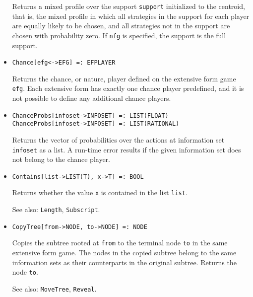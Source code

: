 \begin{itemize}
\bd
Returns a mixed profile over the support \verb+support+
initialized to the centroid, that is, the mixed profile in which 
all strategies in the support for each player are equally likely to be
chosen, and all strategies not in the support are chosen with probability
zero.  If \verb+nfg+ is specified, the support is the full support.  
\ed

\item
\protect \large \begin{verbatim}
Chance[efg<->EFG] =: EFPLAYER
\end{verbatim}\normalsize

\bd
Returns the chance, or nature, player defined on the
extensive form game \verb+efg+.  Each extensive form has exactly one
chance player predefined, and it is not possible to define any additional
chance players.
\ed

\item
\protect \large \begin{verbatim}
ChanceProbs[infoset->INFOSET] =: LIST(FLOAT)
ChanceProbs[infoset->INFOSET] =: LIST(RATIONAL)
\end{verbatim}\normalsize

\bd
Returns the vector of probabilities over the actions at
information set \verb+infoset+ as a list.  A run-time error results if
the given information set does not belong to the chance player.
\ed

\item
\protect \large \begin{verbatim}
Contains[list->LIST(T), x->T] =: BOOL
\end{verbatim}\normalsize

\bd
Returns whether the value \verb+x+ is contained in the list
\verb+list+.
\item
[See also:] {\tt Length}, {\tt Subscript}.
\ed

\item
\protect \large \begin{verbatim}
CopyTree[from->NODE, to->NODE] =: NODE
\end{verbatim}\normalsize

\bd
Copies the subtree rooted at \verb+from+ to the terminal
node \verb+to+ in the same extensive form game.  The nodes in the
copied subtree belong to the same information sets as their counterparts in
the original subtree.  Returns the node \verb+to+.
\item
[See also:] {\tt MoveTree}, {\tt Reveal}.
\ed



\end{itemize}

